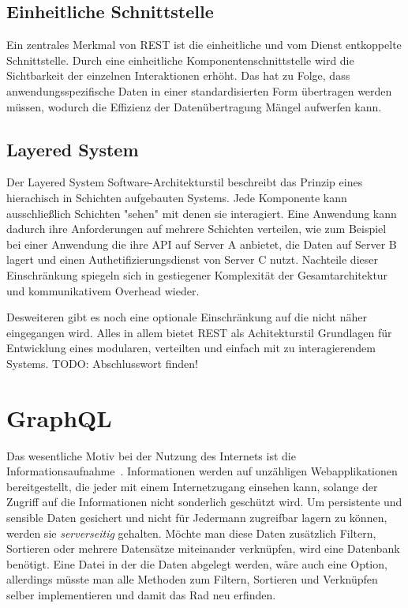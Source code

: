 \subsection{Einheitliche Schnittstelle}
Ein zentrales Merkmal von REST ist die einheitliche und vom Dienst entkoppelte Schnittstelle.
Durch eine einheitliche Komponentenschnittstelle wird die Sichtbarkeit der einzelnen Interaktionen erhöht.
Das hat zu Folge, dass anwendungsspezifische Daten in einer standardisierten Form übertragen werden müssen,
wodurch die Effizienz der Datenübertragung Mängel aufwerfen kann.

\subsection{Layered System}
Der Layered System Software-Architekturstil beschreibt das Prinzip eines hierachisch in Schichten aufgebauten Systems.
Jede Komponente kann ausschließlich Schichten "sehen" mit denen sie interagiert.
Eine Anwendung kann dadurch ihre Anforderungen auf mehrere Schichten verteilen, wie zum Beispiel bei einer Anwendung die ihre API auf Server A anbietet,
die Daten auf Server B lagert und einen Authetifizierungsdienst von Server C nutzt.
Nachteile dieser Einschränkung spiegeln sich in gestiegener Komplexität der Gesamtarchitektur und kommunikativem Overhead wieder.


Desweiteren gibt es noch eine optionale Einschränkung auf die nicht näher eingegangen wird.
Alles in allem bietet REST als Achitekturstil Grundlagen für Entwicklung eines modularen, verteilten und einfach mit zu interagierendem Systems.
TODO: Abschlusswort finden!

\section{GraphQL}
\label{sec:basics:graphql}
Das wesentliche Motiv bei der Nutzung des Internets ist die Informationsaufnahme~\cite{statista-1}\cite{ard-zdf}.
Informationen werden auf unzähligen Webapplikationen bereitgestellt, die jeder mit einem Internetzugang einsehen kann,
solange der Zugriff auf die Informationen nicht sonderlich geschützt wird.
Um persistente und sensible Daten gesichert und nicht für Jedermann zugreifbar lagern zu können, werden sie \emph{serverseitig} gehalten.
Möchte man diese Daten zusätzlich Filtern, Sortieren oder mehrere Datensätze miteinander verknüpfen, wird eine Datenbank benötigt.
Eine Datei in der die Daten abgelegt werden, wäre auch eine Option, allerdings müsste man alle Methoden zum Filtern, Sortieren und Verknüpfen
selber implementieren und damit das Rad neu erfinden.

